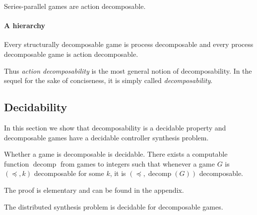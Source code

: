 \documentclass[a4paper,UKenglish]{lipics-v2016}
\DeclareMathOperator{\decomp}{decomp}
\begin{document}
\begin{lemma}\label{lem:adec}
Series-parallel games
are action decomposable.
\end{lemma}





\paragraph*{A hierarchy}


\begin{lemma}\label{lem:hier}
Every structurally decomposable game is process decomposable
and every process decomposable game is action decomposable.
\end{lemma}

Thus \emph{action decomposability} is the most general notion
of decomposability.
In the sequel for the sake of conciseness,
it is simply called \emph{decomposability}.


\subsection{Decidability}
In this section we show that decomposability is a decidable property
and decomposable games have a decidable controller synthesis problem.




\begin{lemma}
\label{decdec}
 Whether a game is decomposable is decidable.
There exists a computable function $\decomp$
from games to integers
such that whenever a game $G$
is $(\preceq,k)$ decomposable
 for some $k$, it is $(\preceq,\decomp(G))$ decomposable.
 \end{lemma}
 The proof is elementary and can be found in the appendix.




\begin{theorem}\label{theo:dec}
The distributed synthesis problem is decidable for decomposable games.
\end{theorem}
\end{document}
